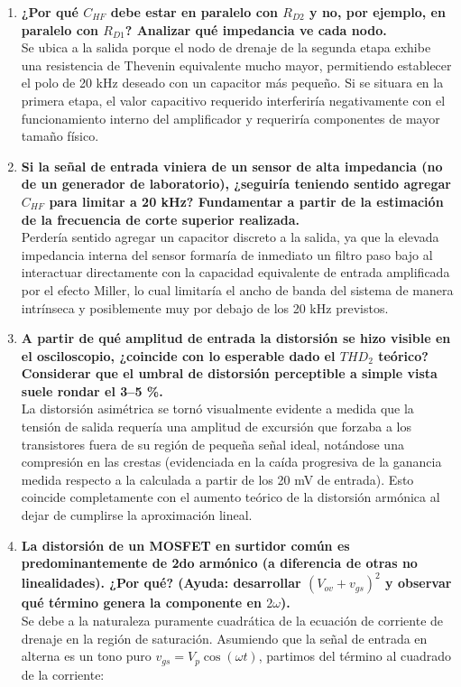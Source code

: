 \begin{enumerate}
\item \textbf{¿Por qué $C_{HF}$ debe estar en paralelo con $R_{D2}$ y no, por ejemplo, en paralelo con $R_{D1}$? Analizar qué impedancia ve cada nodo.} \\
Se ubica a la salida porque el nodo de drenaje de la segunda etapa exhibe una resistencia de Thevenin equivalente mucho mayor, permitiendo establecer el polo de 20 kHz deseado con un capacitor más pequeño. Si se situara en la primera etapa, el valor capacitivo requerido interferiría negativamente con el funcionamiento interno del amplificador y requeriría componentes de mayor tamaño físico.

\item \textbf{Si la señal de entrada viniera de un sensor de alta impedancia (no de un generador de laboratorio), ¿seguiría teniendo sentido agregar $C_{HF}$ para limitar a 20 kHz? Fundamentar a partir de la estimación de la frecuencia de corte superior realizada.} \\
Perdería sentido agregar un capacitor discreto a la salida, ya que la elevada impedancia interna del sensor formaría de inmediato un filtro paso bajo al interactuar directamente con la capacidad equivalente de entrada amplificada por el efecto Miller, lo cual limitaría el ancho de banda del sistema de manera intrínseca y posiblemente muy por debajo de los 20 kHz previstos.

\item \textbf{A partir de qué amplitud de entrada la distorsión se hizo visible en el osciloscopio, ¿coincide con lo esperable dado el $THD_2$ teórico? Considerar que el umbral de distorsión perceptible a simple vista suele rondar el 3--5 \%.} \\
La distorsión asimétrica se tornó visualmente evidente a medida que la tensión de salida requería una amplitud de excursión que forzaba a los transistores fuera de su región de pequeña señal ideal, notándose una compresión en las crestas (evidenciada en la caída progresiva de la ganancia medida respecto a la calculada a partir de los 20 mV de entrada). Esto coincide completamente con el aumento teórico de la distorsión armónica al dejar de cumplirse la aproximación lineal.

\item \textbf{La distorsión de un MOSFET en surtidor común es predominantemente de 2do armónico (a diferencia de otras no linealidades). ¿Por qué? (Ayuda: desarrollar $(V_{ov} +v_{gs})^2$ y observar qué término genera la componente en $2\omega$).} \\
Se debe a la naturaleza puramente cuadrática de la ecuación de corriente de drenaje en la región de saturación. Asumiendo que la señal de entrada en alterna es un tono puro $v_{gs} = V_p \cos(\omega t)$, partimos del término al cuadrado de la corriente:


\end{enumerate}
